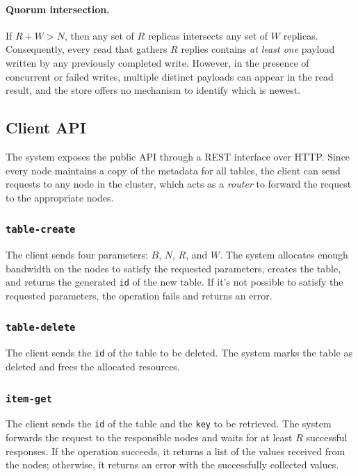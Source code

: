 \paragraph{Quorum intersection.}
If $R + W > N$, then any set of $R$ replicas intersects any set of $W$
replicas.
Consequently, every read that gathers $R$ replies contains \emph{at least one}
payload written by any previously completed write.
However, in the presence of concurrent or failed writes, multiple distinct
payloads can appear in the read result, and the store offers no mechanism to
identify which is newest.

\subsection{Client API}
\label{subsec:interface}

The system exposes the public API through a REST interface over HTTP\@.
Since every node maintains a copy of the metadata for all tables, the client
can send requests to any node in the cluster, which acts as a \emph{router} to
forward the request to the appropriate nodes.

\subsubsection{\texttt{table-create}}
\label{subsubsec:table-create}

The client sends four parameters: $B$, $N$, $R$, and $W$.
The system allocates enough bandwidth on the nodes to satisfy the requested
parameters, creates the table, and returns the generated \texttt{id} of the new
table.
If it's not possible to satisfy the requested parameters, the operation fails
and returns an error.

\subsubsection{\texttt{table-delete}}
\label{subsubsec:table-delete}

The client sends the \texttt{id} of the table to be deleted.
The system marks the table as deleted and frees the allocated resources.

\subsubsection{\texttt{item-get}}
\label{subsubsec:item-get}

The client sends the \texttt{id} of the table and the \texttt{key} to be
retrieved.
The system forwards the request to the responsible nodes and waits for at least
$R$ successful responses.
If the operation succeeds, it returns a list of the values received from the
nodes; otherwise, it returns an error with the successfully collected values.

